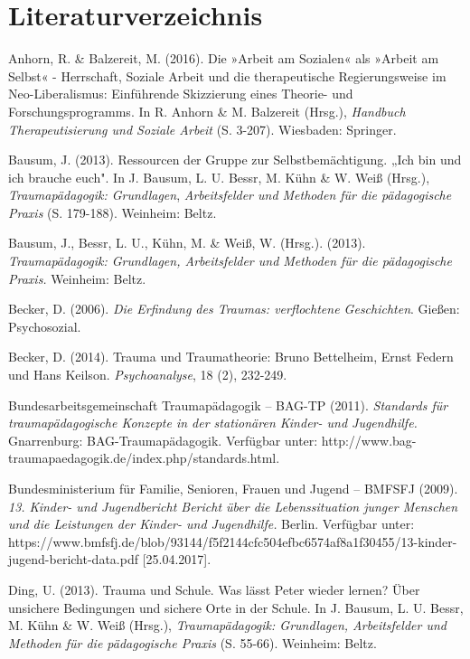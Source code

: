 \section{Literaturverzeichnis}

\setlength{\parindent}{0pt}
\hang
Anhorn, R. \& Balzereit, M. (2016). Die »Arbeit am Sozialen« als »Arbeit am Selbst« - Herrschaft, Soziale Arbeit und die therapeutische Regierungsweise im Neo-Liberalismus: Einf{\"u}hrende Skizzierung eines Theorie- und Forschungsprogramms. In R. Anhorn \& M. Balzereit (Hrsg.), \textit{Handbuch Therapeutisierung und Soziale Arbeit} (S. 3-207). Wiesbaden: Springer.

\hang
Bausum, J. (2013). Ressourcen der Gruppe zur Selbstbem{\"a}chtigung. „Ich bin und ich brauche euch". In J. Bausum, L. U. Bessr, M. Kühn \& W. Weiß (Hrsg.), \textit{Traumapädagogik: Grundlagen}, \textit{Arbeitsfelder und Methoden für die pädagogische Praxis} (S. 179-188). Weinheim: Beltz.

\hang
Bausum, J., Bessr, L. U., Kühn, M. \& Weiß, W. (Hrsg.). (2013). \textit{Traumapädagogik: Grundlagen, Arbeitsfelder und Methoden für die pädagogische Praxis.} Weinheim: Beltz.

\hang
Becker, D. (2006). \textit{Die Erfindung des Traumas: verflochtene Geschichten}. Gießen: Psychosozial.

\hang
Becker, D. (2014). Trauma und Traumatheorie: Bruno Bettelheim, Ernst Federn und Hans Keilson. \textit{Psychoanalyse}, 18 (2), 232-249.

\hang
Bundesarbeitsgemeinschaft Traumap{\"a}dagogik – BAG-TP (2011). \textit{Standards für traumapädagogische Konzepte in der stationären Kinder- und Jugendhilfe.} Gnarrenburg: BAG-Traumapädagogik. Verfügbar unter: http://www.bag-traumapaedagogik.de/index.php/standards.html\break[22.03.2017].

\hang
Bundesministerium für Familie, Senioren, Frauen und Jugend – BMFSFJ (2009). \textit{13. Kinder- und Jugendbericht Bericht über die Lebenssituation junger Menschen und die Leistungen der Kinder- und Jugendhilfe.} Berlin. Verfügbar unter:\\ https://www.bmfsfj.de/blob/93144/f5f2144cfc504efbc6574af8a1f30455/13-kinder-jugend-bericht-data.pdf [25.04.2017].

\hang
Ding, U. (2013). Trauma und Schule. Was l{\"a}sst Peter wieder lernen? {\"U}ber unsichere Bedingungen und sichere Orte in der Schule. In J. Bausum, L. U. Bessr, M. Kühn \& W. Weiß (Hrsg.), \textit{Traumapädagogik: Grundlagen, Arbeitsfelder und Methoden für die pädagogische Praxis} (S. 55-66). Weinheim: Beltz.

